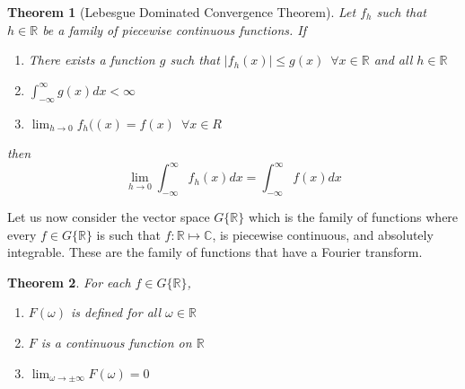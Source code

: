 \documentclass{report}
\newtheorem{theorem}{Theorem}[chapter]
\theoremstyle{definition}
\theoremstyle{remark}
\newcommand{\R}{\mathbb{R}}
\begin{document}
\begin{theorem}[Lebesgue Dominated Convergence Theorem]
    Let $f_h$ such that $h\in \R$ be a family of piecewise continuous functions. If  \label{theo:ldct}
    \begin{enumerate}
        \item There exists a function $g$ such that $|f_h(x)|\leq g(x) \,\,\, \forall x\in\R $ and all $h\in\R$
        \item $\displaystyle{\int^\infty_{-\infty}g(x)dx<\infty}$
        \item $\displaystyle{\lim_{h\rightarrow 0}f_h((x)=f(x) \,\,\, \forall x\in R}$
    \end{enumerate}
    then \begin{equation*}
        \lim_{h\rightarrow 0}\int^\infty_{-\infty}f_h(x)dx =\int^\infty_{-\infty}f(x)dx
    \end{equation*}
\end{theorem}
Let us now consider the vector space $G\{\R\}$ which is the family of functions where every $f\in G\{\R\}$ is such that $f:\R\mapsto \mathbb{C}$, is piecewise continuous, and absolutely integrable. These are the family of functions that have a Fourier transform. 
\begin{theorem}
    For each $f\in G\{\R\}$,
    \begin{enumerate}
        \item $F(\omega)$ is defined for all $\omega \in \R$
        \item $F$ is a continuous function on $\R$
        \item $\displaystyle{\lim_{\omega \rightarrow \pm \infty}F(\omega)=0}$
    \end{enumerate}
\end{theorem}
\end{document}
